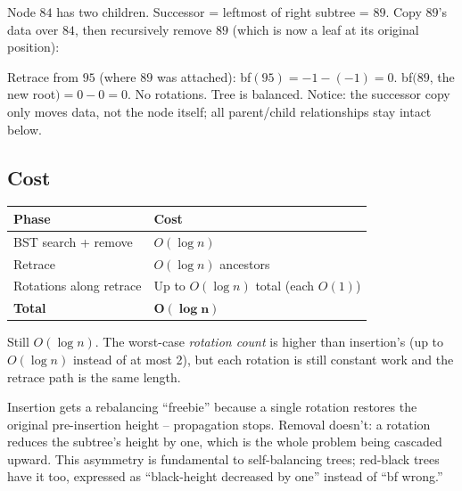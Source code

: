\documentclass[11pt]{article}
\begin{document}
Node $84$ has two children. Successor = leftmost of right subtree = $89$. Copy $89$'s data over $84$, then recursively remove $89$ (which is now a leaf at its original position):

\begin{center}
\end{center}

Retrace from $95$ (where $89$ was attached): bf$(95) = -1 - (-1) = 0$. bf$(89$, the new root$) = 0 - 0 = 0$. No rotations. Tree is balanced. Notice: the successor copy only moves data, not the node itself; all parent/child relationships stay intact below.

\subsection*{Cost}

\begin{center}
\begin{tabular}{ll}
Phase              & Cost \\
\hline
BST search + remove & $O(\log n)$ \\
Retrace             & $O(\log n)$ ancestors \\
Rotations along retrace & Up to $O(\log n)$ total (each $O(1)$) \\
\hline
\textbf{Total}      & $\mathbf{O(\log n)}$ \\
\end{tabular}
\end{center}

Still $O(\log n)$. The worst-case \emph{rotation count} is higher than insertion's (up to $O(\log n)$ instead of at most 2), but each rotation is still constant work and the retrace path is the same length.

\begin{ideabox}
Insertion gets a rebalancing ``freebie'' because a single rotation restores the original pre-insertion height -- propagation stops. Removal doesn't: a rotation reduces the subtree's height by one, which is the whole problem being cascaded upward. This asymmetry is fundamental to self-balancing trees; red-black trees have it too, expressed as ``black-height decreased by one'' instead of ``bf wrong.''
\end{ideabox}
\end{document}
